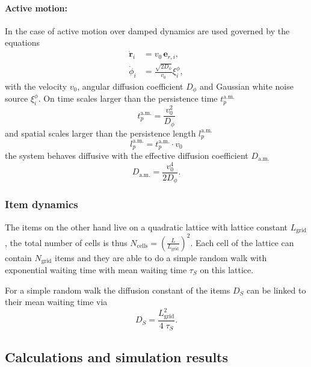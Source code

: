 \paragraph{Active motion:}

In the case of active motion over damped dynamics \cite{Milster} are used governed by the equations
%
\begin{align}
 \nonumber \dot{\mathbf r}_i &= v_0\,\mathbf e_{r,i},\\
 \dot \phi_i &= \frac{\sqrt{2 D_\phi}}{v_0}\xi_i^\phi, 
\label{eq:DGLactm_simset}
\end{align}
%
with the velocity $v_0$, angular diffusion coefficient $D_\phi$ and Gaussian white noise source $\xi_i^\phi$.
On time scales larger than the persistence time $t_p^{\text{a.m.}}$
%
\begin{equation}
 t_{p}^{\text{a.m.}}=\frac{v_0^2}{D_\phi} 
\label{eq:perstime_simset} 
\end{equation}
%
and spatial scales larger than the persistence length $l_p^{\text{a.m.}}$
%
\begin{equation}
 l_p^{\text{a.m.}}=t_p^{\text{a.m.}}\cdot v_0
\label{eq:perslength_simset}
\end{equation}
%
the system behaves diffusive with the effective diffusion coefficient $D_{\text{a.m.}}$
%
\begin{equation}
 D_{\text{a.m.}}=\frac{v_0^4}{2 D_\phi}.
\label{eq:Dam_simset}
\end{equation}

\subsubsection{Item dynamics}

The items on the other hand live on a quadratic lattice with lattice constant $L_\text{grid}$, the total number of cells is thus $N_\text{cells}=\left(\frac{L}{L_\text{grid}}\right)^2$.
Each cell of the lattice can contain $N_\text{grid}$ items and they are able to do a simple random walk with exponential waiting time with mean waiting time $\tau_S$ on this lattice.

For a simple random walk the diffusion constant of the items $D_S$ can be linked to their mean waiting time via \cite{SokolovKlafter}
%
\begin{equation}
	D_S = \frac{L_\text{grid}^2}{4\;\tau_S}.
\end{equation}


\subsection{Calculations and simulation results}

